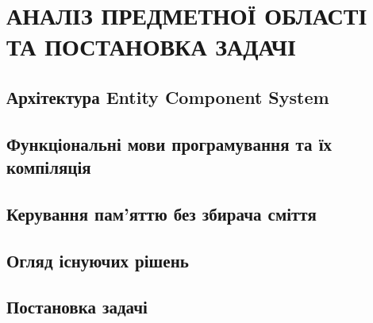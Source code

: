\chapter{АНАЛІЗ ПРЕДМЕТНОЇ ОБЛАСТІ\\ТА ПОСТАНОВКА ЗАДАЧІ}

\section{Архітектура Entity Component System}

\section{Функціональні мови програмування та їх компіляція}

\section{Керування пам'яттю без збирача сміття}

\section{Огляд існуючих рішень}

\section{Постановка задачі}
